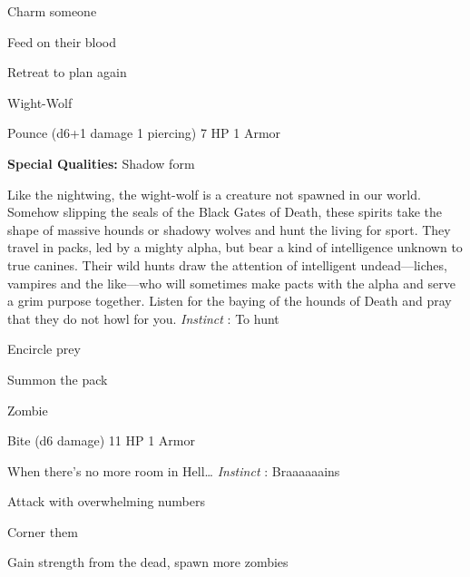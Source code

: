 \item Charm someone

 
\item Feed on their blood

 
\item Retreat to plan again


\stopitemize
 
\startMonsterName
Wight-Wolf	 
\stopMonsterName
 

Pounce (d6+1 damage 1 piercing)	7 HP	1 Armor

 


 
\startMonsterQualities
{\bf Special Qualities:}  Shadow form
\stopMonsterQualities
 
\startMonsterDescription
Like the nightwing, the wight-wolf is a creature not spawned in our world.  Somehow slipping the seals of the Black Gates of Death, these spirits take the shape of massive hounds or shadowy wolves and hunt the living for sport.  They travel in packs, led by a mighty alpha, but bear a kind of intelligence unknown to true canines.  Their wild hunts draw the attention of intelligent undead—liches, vampires and the like—who will sometimes make pacts with the alpha and serve a grim purpose together.  Listen for the baying of the hounds of Death and pray that they do not howl for you. {\em Instinct} : To hunt
\stopMonsterDescription
 
\startitemize[1,packed]

\item Encircle prey

 
\item Summon the pack


\stopitemize
 
\startMonsterName
Zombie	 
\stopMonsterName
 

Bite (d6 damage)	11 HP	1 Armor

 


 
\startMonsterDescription
When there’s no more room in Hell… {\em Instinct} : Braaaaaains
\stopMonsterDescription
 
\startitemize[1,packed]

\item Attack with overwhelming numbers

 
\item Corner them

 
\item Gain strength from the dead, spawn more zombies


\stopitemize
 






